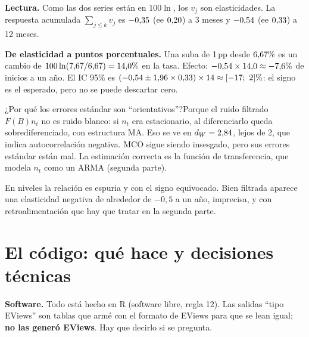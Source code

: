 \documentclass[11pt,a4paper]{article}
\newcommand{\Q}[2]{\begin{pregunta}{#1}#2\end{pregunta}}
\begin{document}
\textbf{Lectura.} Como las dos series est\'an en $100\ln$, los $v_j$ son elasticidades. La respuesta acumulada $\sum_{j\le k}v_j$ es $-0{,}35$ (ee $0{,}20$) a 3 meses y $-0{,}54$ (ee $0{,}33$) a 12 meses.

\textbf{De elasticidad a puntos porcentuales.} Una suba de 1\,pp desde $6{,}67\%$ es un cambio de $100\ln(7{,}67/6{,}67)=14{,}0\%$ en la tasa. Efecto: $-0{,}54\times14{,}0\approx-7{,}6\%$ de inicios a un a\~no. El IC 95\% es $(-0{,}54\pm1{,}96\times0{,}33)\times14\approx[-17;\ 2]\%$: el signo es el esperado, pero no se puede descartar cero.

\Q{¿Por qu\'e los errores est\'andar son ``orientativos''?}{Porque el ruido filtrado $F(B)n_t$ no es ruido blanco: si $n_t$ era estacionario, al diferenciarlo queda sobrediferenciado, con estructura MA. Eso se ve en $d_W=2{,}84$, lejos de 2, que indica autocorrelaci\'on negativa. MCO sigue siendo insesgado, pero sus errores est\'andar est\'an mal. La estimaci\'on correcta es la funci\'on de transferencia, que modela $n_t$ como un ARMA (segunda parte).}

\begin{clave}En niveles la relaci\'on es espuria y con el signo equivocado. Bien filtrada aparece una elasticidad negativa de alrededor de $-0{,}5$ a un a\~no, imprecisa, y con retroalimentaci\'on que hay que tratar en la segunda parte.\end{clave}

\section{El c\'odigo: qu\'e hace y decisiones t\'ecnicas}
\textbf{Software.} Todo est\'a hecho en R (software libre, regla 12). Las salidas ``tipo EViews'' son tablas que arm\'e con el formato de EViews para que se lean igual; \textbf{no las gener\'o EViews}. Hay que decirlo si se pregunta.
\end{document}
